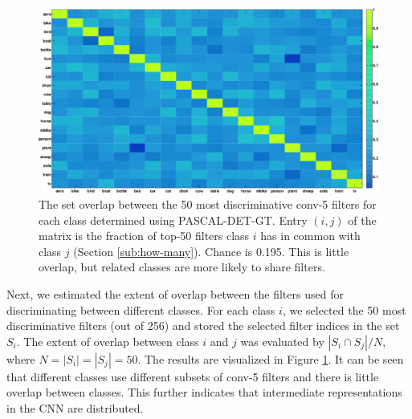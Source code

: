 \begin{figure}[t!]
\centering
\includegraphics[width=1.0\linewidth]{images/ftNet.png}
\caption{The set overlap between the 50 most discriminative conv-5 filters for each class determined using PASCAL-DET-GT.
Entry $(i, j)$ of the matrix is the fraction of top-50 filters class $i$ has in common with class $j$ (Section \ref{sub:how-many}). Chance is 0.195. This is little overlap, but related classes are more likely to share filters.}
\label{fig:overlap}
\end{figure}

Next, we estimated the extent of overlap between the filters used for discriminating between different classes.
For each class $i$, we selected the 50 most discriminative filters (out of 256) and stored the selected filter indices in the set $S_i$.
The extent of overlap between class $i$ and $j$ was evaluated by $|S_i \cap S_j| / N$,
where $N = |S_i| = |S_j| = 50$. The results are visualized in Figure \ref{fig:overlap}. It can be seen that different classes use different subsets of conv-5 filters and there is little overlap between classes. This further indicates that intermediate representations in the CNN are distributed.
